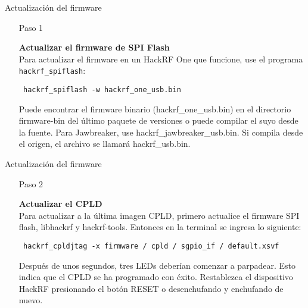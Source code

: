 \begin{frame}{Actualización del firmware}

\begin{itemize}
    \item [Paso 1]
    {\textbf {Actualizar el firmware de SPI Flash }\\ Para actualizar el firmware en un HackRF One que funcione, use el programa \texttt{hackrf\_spiflash}:
    
    \begin{block}{}
    \texttt{
    hackrf\_spiflash -w hackrf\_one\_usb.bin}
    \end{block}
    
    Puede encontrar el firmware binario (hackrf\_one\_usb.bin) en el directorio firmware-bin del último paquete de versiones o puede compilar el suyo desde la fuente. Para Jawbreaker, use hackrf\_jawbreaker\_usb.bin. Si compila desde el origen, el archivo se llamará hackrf\_usb.bin. 
    }
    
\end{itemize}
\end{frame}

\begin{frame}{Actualización del firmware}

\begin{itemize}
    \item [Paso 2]
    {\textbf {Actualizar el CPLD}\\ Para actualizar a la última imagen CPLD, primero actualice el firmware SPI flash, libhackrf y hackrf-tools. Entonces en la terminal se ingresa lo siguiente:
    
    \begin{block}{}
    \texttt{
    hackrf\_cpldjtag -x firmware / cpld / sgpio\_if / default.xsvf}
    \end{block}
    
    Después de unos segundos, tres LEDs deberían comenzar a parpadear. Esto indica que el CPLD se ha programado con éxito. Restablezca el dispositivo HackRF presionando el botón RESET o desenchufando y enchufando de nuevo.
    }
    
\end{itemize}
\end{frame}

